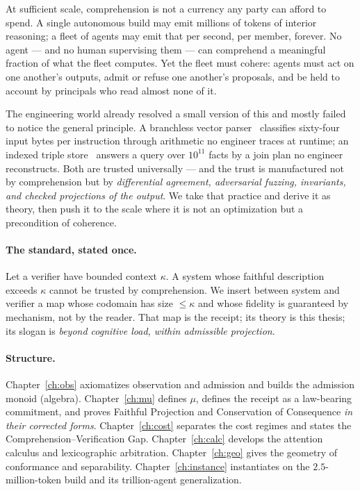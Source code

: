 \documentclass[11pt,oneside]{book}
\theoremstyle{definition}
\theoremstyle{plain}
\theoremstyle{remark}
\newcommand{\muop}{\mu}                        %
\newcommand{\CL}{\kappa}                       %
\begin{document}
At sufficient scale, comprehension is not a currency any party can afford to spend.
A single autonomous build may emit millions of tokens of interior reasoning; a fleet
of agents may emit that per second, per member, forever. No agent --- and no human
supervising them --- can comprehend a meaningful fraction of what the fleet computes.
Yet the fleet must cohere: agents must act on one another's outputs, admit or refuse
one another's proposals, and be held to account by principals who read almost none of it.

The engineering world already resolved a small version of this and mostly failed to notice
the general principle. A branchless vector parser~\cite{langdale2019simdjson} classifies
sixty-four input bytes per instruction through arithmetic no engineer traces at runtime;
an indexed triple store~\cite{bast2017qlever} answers a query over $10^{11}$ facts by a
join plan no engineer reconstructs. Both are trusted universally --- and the trust is manufactured not by comprehension but by
\emph{differential agreement, adversarial fuzzing, invariants, and checked projections of
the output}. We take that practice and derive it as theory, then push it to the scale where
it is not an optimization but a precondition of coherence.

\paragraph{The standard, stated once.} Let a verifier have bounded context $\CL$. A system
whose faithful description exceeds $\CL$ cannot be trusted by comprehension. We insert
between system and verifier a map whose codomain has size $\le\CL$ and whose fidelity is
guaranteed by mechanism, not by the reader. That map is the receipt; its theory is this
thesis; its slogan is \emph{beyond cognitive load, within admissible projection}.

\paragraph{Structure.} Chapter~\ref{ch:obs} axiomatizes observation and admission and
builds the admission monoid (algebra). Chapter~\ref{ch:mu} defines $\muop$, defines the
receipt as a law-bearing commitment, and proves Faithful Projection and Conservation of
Consequence \emph{in their corrected forms}. Chapter~\ref{ch:cost} separates the cost
regimes and states the Comprehension--Verification Gap. Chapter~\ref{ch:calc} develops the
attention calculus and lexicographic arbitration. Chapter~\ref{ch:geo} gives the geometry
of conformance and separability. Chapter~\ref{ch:instance} instantiates on the
$2.5$-million-token build and its trillion-agent generalization.
\end{document}
